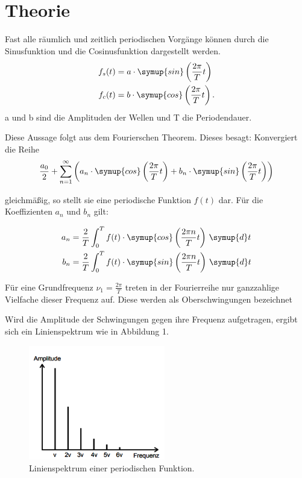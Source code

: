 \section{Theorie}
\label{sec:Theorie}

\cite{sample}
Fast alle räumlich und zeitlich periodischen Vorgänge können durch die Sinusfunktion
und die Cosinusfunktion dargestellt werden.
\begin{align}
  f_s(t) &= a \cdot \symup{sin}\left(\frac{2\pi}{T}t\right) \\
  f_c(t) &= b \cdot \symup{cos}\left(\frac{2\pi}{T}t\right).
\end{align}
a und b sind die Amplituden der Wellen und T die Periodendauer.

Diese Aussage folgt aus dem Fourierschen Theorem. Dieses besagt: Konvergiert die Reihe
\begin{equation}
  \frac{a_0}{2} + \sum_{n=1}^\infty \left(a_n \cdot \symup{cos}\left(\frac{2\pi}{T}t\right) + b_n \cdot \symup{sin}\left(\frac{2\pi}{T}t\right) \right)
\end{equation}

gleichmäßig, so stellt sie eine periodische Funktion $f(t)$ dar. Für die Koeffizienten $a_n$ und $b_n$ gilt:

\begin{align}
  a_n &= \frac{2}{T} \int_{0}^{T} f(t) \cdot \symup{cos}\left(\frac{2\pi n}{T}t\right) \, \symup{d}t \\
  b_n &= \frac{2}{T} \int_{0}^{T} f(t) \cdot \symup{sin}\left(\frac{2\pi n}{T}t\right) \, \symup{d}t
\end{align}

Für eine Grundfrequenz $\nu_1 = \frac{2\pi}{T}$ treten in der Fourierreihe nur ganzzahlige Vielfache dieser
Frequenz auf. Diese werden als Oberschwingungen bezeichnet

Wird die Amplitude der Schwingungen gegen ihre Frequenz aufgetragen, ergibt sich ein
Linienspektrum wie in Abbildung 1.

\begin{figure}[H]
  \centering
  \includegraphics[height=5cm]{Linienspektrum.PNG}
  \caption{Linienspektrum einer periodischen Funktion. \cite{sample}}
  \label{fig:Linienspektrum}
\end{figure}

